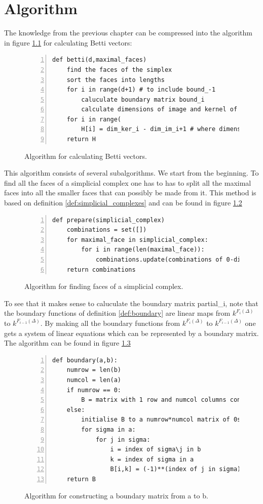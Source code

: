 \documentclass[11pt,a4paper,twoside]{report}
\begin{document}
\chapter{Algorithm}\label{ch:algorithm}
The knowledge from the previous chapter can be compressed into the algorithm in figure \ref{fig:Algorithm} for calculating Betti vectors:
\begin{figure}[H]
\begin{lstlisting}[numbers=left]
def betti(d,maximal_faces)
    find the faces of the simplex 
    sort the faces into lengths
    for i in range(d+1) # to include bound_-1
        caluculate boundary matrix bound_i
        calculate dimensions of image and kernel of bound_i
    for i in range(  
        H[i] = dim_ker_i - dim_im_i+1 # where dimensions are 0 if not calculated
    return H
\end{lstlisting}
\caption{Algorithm for calculating Betti vectors.}
\label{fig:Algorithm}
\end{figure}
This algorithm consists of several subalgorithms. We start from the beginning. To find all the faces of a simplicial complex one has to has to split all the maximal faces into all the smaller faces that can possibly be made from it. This method is based on definition \ref{def:simplicial_complexes} and can be found in figure \ref{fig:Algorithm_faces}
\begin{figure}[H]
\begin{lstlisting}[numbers=left]
def prepare(simplicial_complex)
    combinations = set([])
    for maximal_face in simplicial_complex:
        for i in range(len(maximal_face)):
            combinations.update(combinations of 0-dimensional faces in maximal_face of length i)
    return combinations    
\end{lstlisting}
\caption{Algorithm for finding faces of a simplicial complex.}
\label{fig:Algorithm_faces}
\end{figure}
To see that it makes sense to caluculate the boundary matrix partial\_i, note that the boundary functions of definition \ref{def:boundary} are linear maps from $k^{F_i(\Delta)}$ to $k^{F_{i-1}(\Delta)}$. By making all the boundary functions from $k^{F_i(\Delta)}$ to $k^{F_{i-1}(\Delta)}$ one gets a system of linear equations which can be represented by a boundary matrix. The algorithm can be found in figure \ref{fig:Algorithm_matrix}
\begin{figure}[H]
\begin{lstlisting}[numbers=left]
def boundary(a,b):
    numrow = len(b)
    numcol = len(a)
    if numrow == 0:
        B = matrix with 1 row and numcol columns consisting of 1s
    else:
        initialise B to a numrow*numcol matrix of 0s 
        for sigma in a:
            for j in sigma:
                i = index of sigma\j in b
                k = index of sigma in a
                B[i,k] = (-1)**(index of j in sigma) 
    return B
\end{lstlisting}
\caption{Algorithm for constructing a boundary matrix from a to b.}
\label{fig:Algorithm_matrix}
\end{figure}
\end{document}
